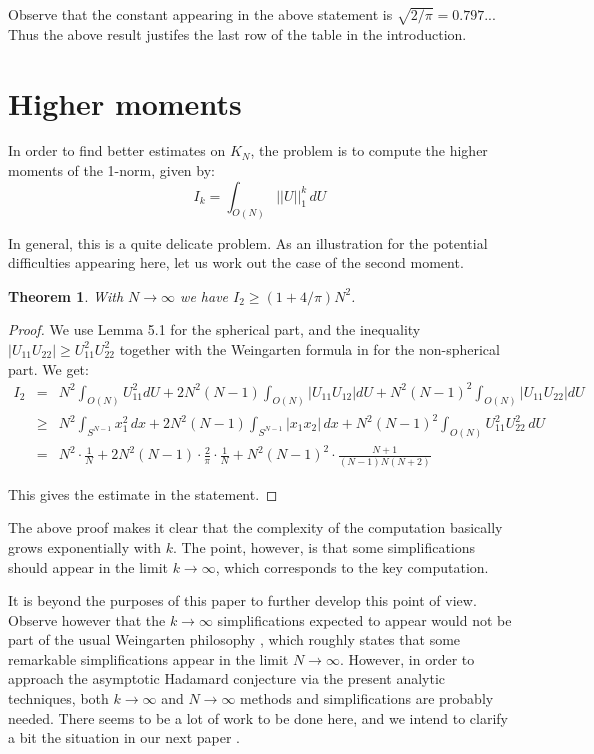 \documentclass[12pt]{amsart}
\newtheorem{theorem}{Theorem}[section]
\begin{document}
Observe that the constant appearing in the above statement is $\sqrt{2/\pi}=0.797..$. Thus the above result justifes the last row of the table in the introduction.

\section{Higher moments}

In order to find better estimates on $K_N$, the problem is to compute the higher moments of the 1-norm, given by:
$$I_k=\int_{O(N)}||U||_1^k\,dU$$

In general, this is a quite delicate problem. As an illustration for the potential difficulties appearing here, let us work out the case of the second moment. 

\begin{theorem}
With $N\to\infty$ we have $I_2\geq (1+4/\pi)N^2$.
\end{theorem}

\begin{proof}
We use Lemma 5.1 for the spherical part, and the inequality $|U_{11}U_{22}|\geq U_{11}^2U_{22}^2$ together with the Weingarten formula in \cite{csn} for the non-spherical part. We get:
\begin{eqnarray*}
I_2
&=&N^2\int_{O(N)}\!U_{11}^2dU+2N^2(N-1)\int_{O(N)}\!|U_{11}U_{12}|dU+N^2(N-1)^2\int_{O(N)}\!|U_{11}U_{22}|dU\\
&\geq&N^2\int_{S^{N-1}}x_1^2\,dx+2N^2(N-1)\int_{S^{N-1}}|x_1x_2|\,dx+N^2(N-1)^2\int_{O(N)}U_{11}^2U_{22}^2\,dU\\
&=&N^2\cdot\frac{1}{N}+2N^2(N-1)\cdot\frac{2}{\pi}\cdot\frac{1}{N}+N^2(N-1)^2\cdot\frac{N+1}{(N-1)N(N+2)}
\end{eqnarray*}

This gives the estimate in the statement.
\end{proof}

The above proof makes it clear that the complexity of the computation basically grows exponentially with $k$. The point, however, is that some simplifications should appear in the limit $k\to\infty$, which corresponds to the key computation.

It is beyond the purposes of this paper to further develop this point of view. Observe however that the $k\to\infty$ simplifications expected to appear would not be part of the usual Weingarten philosophy \cite{wei}, which roughly states that some remarkable simplifications appear in the limit $N\to\infty$. However, in order to approach the asymptotic Hadamard conjecture via the present analytic techniques, both $k\to\infty$ and $N\to\infty$ methods and simplifications are probably needed. There seems to be a lot of work to be done here, and we intend to clarify a bit the situation in our next paper \cite{bcs}.
\end{document}
